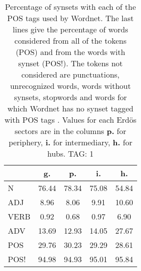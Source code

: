 \begin{table}[h!]
\begin{center}
\begin{tabular}{| l | c | c | c | c |}\hline
 & g. & p. & i. & h. \\\hline
N & 76.44  & 78.34  & 75.08  & 54.84 \\\hline
ADJ & 8.96  & 8.06  & 9.91  & 10.60 \\\hline
VERB & 0.92  & 0.68  & 0.97  & 6.90 \\\hline
ADV & 13.69  & 12.93  & 14.05  & 27.67 \\\hline
POS & 29.76  & 30.23  & 29.29  & 28.61 \\\hline
POS! & 94.98  & 94.93  & 95.01  & 95.84 \\\hline
\end{tabular}
\caption{Percentage of synsets with each of the POS tags used by Wordnet. The last lines give the percentage of words considered from all of the tokens (POS) and from the words with synset (POS!). The tokens not considered are punctuations, unrecognized words, words without synsets, stopwords and words for which Wordnet has no synset  tagged with POS tags . Values for each Erd\"os sectors are in the columns {{\bf p.}} for periphery, {{\bf i.}} for intermediary, {{\bf h.}} for hubs. TAG: 1}
\end{center}
\end{table}